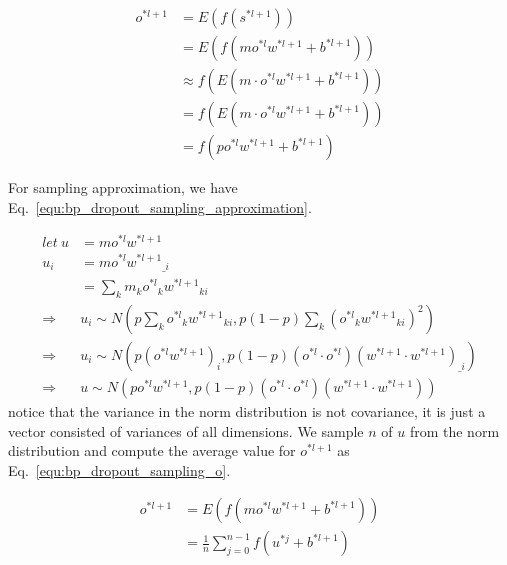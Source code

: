 \documentclass[runningheads,openany]{xhlPaper}
\begin{document}
\begin{equation}
\label{equ:bp_dropout_mean_approximation}
\begin{aligned}
{o^{*l + 1}} &= E\left( {f\left( {{s^{*l + 1}}} \right)} \right)\\
 &= E\left( {f\left( {m{o^{*l}}{w^{*l + 1}} + {b^{*l + 1}}} \right)} \right)\\
 &\approx f\left( {E\left( {m \cdot {o^{*l}}{w^{*l + 1}} + {b^{*l + 1}}} \right)} \right)\\
 &= f\left( {E\left( {m \cdot {o^{*l}}{w^{*l + 1}} + {b^{*l + 1}}} \right)} \right)\\
 &= f\left( {p{o^{*l}}{w^{*l + 1}} + {b^{*l + 1}}} \right)
\end{aligned}
\end{equation}

For sampling approximation, we have Eq.~\ref{equ:bp_dropout_sampling_approximation}.

\begin{equation}
\label{equ:bp_dropout_sampling_approximation}
\begin{aligned}
let\ u &= m{o^{*l}}{w^{*l + 1}}\\
{u_i} &= m{o^{*l}}{w^{*l + 1}}_{\_i}\\
 &= \sum\limits_k {{m_k}{o^{*l}}_k{w^{*l + 1}}_{ki}} \\
 \Rightarrow &{u_i} \sim N\left( {p\sum\limits_k {{o^{*l}}_k{w^{*l + 1}}_{ki}} ,p\left( {1 - p} \right)\sum\limits_k {{{\left( {{o^{*l}}_k{w^{*l + 1}}_{ki}} \right)}^2}} } \right)\\
 \Rightarrow &{u_i} \sim N\left( {p{{\left( {{o^{*l}}{w^{*l + 1}}} \right)}_i},p\left( {1 - p} \right)\left( {{o^{*l}} \cdot {o^{*l}}} \right){{\left( {{w^{*l + 1}} \cdot {w^{*l + 1}}} \right)}_{\_i}}} \right)\\
 \Rightarrow &u \sim N\left( {p{o^{*l}}{w^{*l + 1}},p\left( {1 - p} \right)\left( {{o^{*l}} \cdot {o^{*l}}} \right)\left( {{w^{*l + 1}} \cdot {w^{*l + 1}}} \right)} \right)
\end{aligned}
\end{equation}
notice that the variance in the norm distribution is not covariance, it is just a vector consisted of variances of all dimensions. We sample $n$ of $u$ from the norm distribution and compute the average value for $o^{*l + 1}$ as Eq.~\ref{equ:bp_dropout_sampling_o}.

\begin{equation}
\label{equ:bp_dropout_sampling_o}
\begin{aligned}
{o^{*l + 1}} &= E\left( {f\left( {m{o^{*l}}{w^{*l + 1}} + {b^{*l + 1}}} \right)} \right)\\
 &= \frac{1}{n}\sum\limits_{j = 0}^{n - 1} {f\left( {{u^{*j}} + {b^{*l + 1}}} \right)} 
\end{aligned}
\end{equation}
\end{document}

